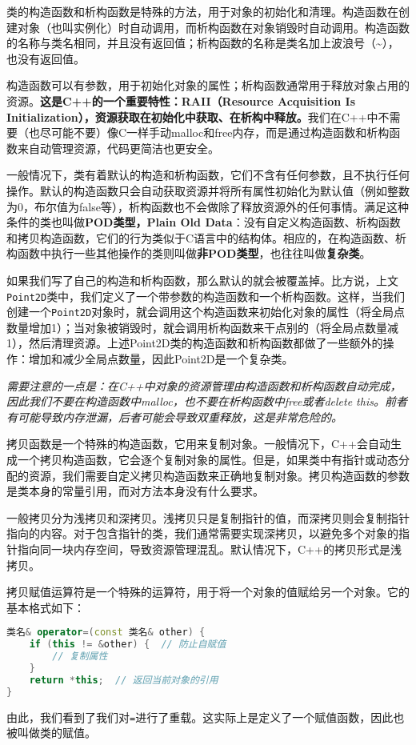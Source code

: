 \documentclass[../main.tex]{subfiles}
\begin{document}
类的构造函数和析构函数是特殊的方法，用于对象的初始化和清理。构造函数在创建对象（也叫实例化）时自动调用，而析构函数在对象销毁时自动调用。构造函数的名称与类名相同，并且没有返回值；析构函数的名称是类名加上波浪号（\textasciitilde），也没有返回值。

构造函数可以有参数，用于初始化对象的属性；析构函数通常用于释放对象占用的资源。\textbf{这是C++的一个重要特性：RAII（Resource Acquisition Is Initialization），资源获取在初始化中获取、在析构中释放。}我们在C++中不需要（也尽可能不要）像C一样手动malloc和free内存，而是通过构造函数和析构函数来自动管理资源，代码更简洁也更安全。

一般情况下，类有着默认的构造和析构函数，它们不含有任何参数，且不执行任何操作。默认的构造函数只会自动获取资源并将所有属性初始化为默认值（例如整数为0，布尔值为false等），析构函数也不会做除了释放资源外的任何事情。满足这种条件的类也叫做\textbf{POD类型，Plain Old Data}：没有自定义构造函数、析构函数和拷贝构造函数，它们的行为类似于C语言中的结构体。相应的，在构造函数、析构函数中执行一些其他操作的类则叫做\textbf{非POD类型}，也往往叫做\textbf{复杂类}。

如果我们写了自己的构造和析构函数，那么默认的就会被覆盖掉。比方说，上文\texttt{Point2D}类中，我们定义了一个带参数的构造函数和一个析构函数。这样，当我们创建一个\texttt{Point2D}对象时，就会调用这个构造函数来初始化对象的属性（将全局点数量增加1）；当对象被销毁时，就会调用析构函数来干点别的（将全局点数量减1），然后清理资源。上述Point2D类的构造函数和析构函数都做了一些额外的操作：增加和减少全局点数量，因此Point2D是一个复杂类。

\emph{
  需要注意的一点是：在C++中对象的资源管理由构造函数和析构函数自动完成，因此我们不要在构造函数中malloc，也不要在析构函数中free或者delete this。前者有可能导致内存泄漏，后者可能会导致双重释放，这是非常危险的。
}

拷贝函数是一个特殊的构造函数，它用来复制对象。一般情况下，C++会自动生成一个拷贝构造函数，它会逐个复制对象的属性。但是，如果类中有指针或动态分配的资源，我们需要自定义拷贝构造函数来正确地复制对象。拷贝构造函数的参数是类本身的常量引用，而对方法本身没有什么要求。

一般拷贝分为浅拷贝和深拷贝。浅拷贝只是复制指针的值，而深拷贝则会复制指针指向的内容。对于包含指针的类，我们通常需要实现深拷贝，以避免多个对象的指针指向同一块内存空间，导致资源管理混乱。默认情况下，C++的拷贝形式是浅拷贝。

拷贝赋值运算符是一个特殊的运算符，用于将一个对象的值赋给另一个对象。它的基本格式如下：
\begin{lstlisting}[language=C++]
类名& operator=(const 类名& other) {
    if (this != &other) {  // 防止自赋值
        // 复制属性
    }
    return *this;  // 返回当前对象的引用
}
\end{lstlisting}
由此，我们看到了我们对\texttt{=}进行了重载。这实际上是定义了一个赋值函数，因此也被叫做类的赋值。
\end{document}
